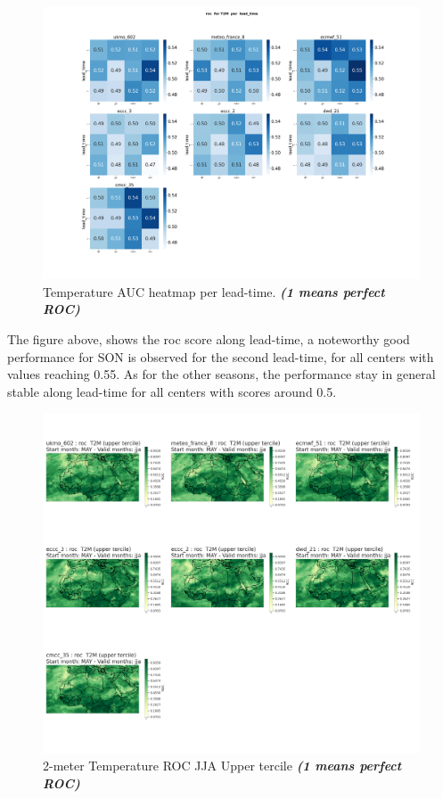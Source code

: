 \begin{figure}[H]
    \centering
    \includegraphics[width=1\linewidth]{plots/prob/roc/roc_T2M_lead_time.png}
    \caption{Temperature AUC  heatmap per lead-time. \textbf{\textit{(1 means perfect ROC)}}}
\end{figure}


The figure above, shows the roc score along lead-time, a noteworthy good performance for SON is observed for the second lead-time, for all centers with values reaching 0.55. As for the other seasons, the performance stay in general stable along lead-time for all centers with scores around 0.5.


\begin{figure}[H]
    \centering
    \includegraphics[width=1\linewidth]{plots/prob/roc/roc_jja_t2m_upper.png}
    \caption{2-meter Temperature ROC JJA Upper tercile \textbf{\textit{(1 means perfect ROC)}}}
\end{figure}


